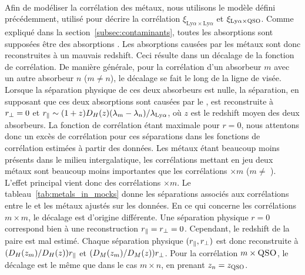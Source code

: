 \documentclass[11pt, twoside, a4paper, openright]{report}
\begin{document}
\paragraph{}
Afin de modéliser la corrélation des métaux, nous utilisons le modèle défini précédemment, utilisé pour décrire la corrélation $\xi_{\mathrm{Ly}\alpha\times\mathrm{Ly}\alpha}$ et $\xi_{\mathrm{Ly}\alpha\times\textsc{\textsc{QSO}}}$.
Comme expliqué dans la section~\ref{subsec:contaminants}, toutes les absorptions sont supposées être des absorptions \lya{}. Les absorptions causées par les métaux sont donc reconstruites à un mauvais redshift. Ceci résulte dans un décalage de la fonction de corrélation.
De manière générale, pour la corrélation d'un absorbeur $m$ avec un autre absorbeur $n$ ($m \neq n$), le décalage se fait le long de la ligne de visée. Lorsque la séparation physique de ces deux absorbeurs est nulle, la séparation, en supposant que ces deux absorptions sont causées par le \lya{}, est reconstruite à $r_{\perp}{} = 0$ et $r_{\parallel}{} \sim (1+z)D_H(z)(\lambda_m - \lambda_{n} ) / \lambda_{\mathrm{Ly}\alpha}$, où $z$ est le redshift moyen des deux absorbeurs.
La fonction de corrélation étant maximale pour $r = 0$, nous attentons donc un excès de corrélation pour ces séparations dans les fonctions de corrélation estimées à partir des données. Les métaux étant beaucoup moins présents dans le milieu intergalatique, les corrélations mettant en jeu deux métaux sont beaucoup moins importantes que les corrélations \lya{}$\times m$ ($m \neq$ \lya). L'effet principal vient donc des corrélations \lya{}$\times m$. 
Le tableau~\ref{tab:metals_in_mocks} donne les séparations associés aux corrélations entre le \lya{} et les métaux ajustés sur les données.
En ce qui concerne les corrélations $m \times m$, le décalage est d'origine différente. Une séparation physique $r=0$ correspond bien à une reconstruction $r_{\parallel}{} = r_{\perp}{} = 0$. Cependant, le redshift de la paire est mal estimé. Chaque séparation physique $(r_{\parallel}{}, r_{\perp}{})$ est donc reconstruite à $(D_H(z_m) / D_H(z))r_{\parallel}{}$ et $(D_M(z_m)/D_M(z))r_{\perp}{}$.
Pour la corrélation $m \times \textsc{QSO}$, le décalage est le même que dans le cas $m\times n$, en prenant $z_n = z_{\textsc{QSO}}$.
\end{document}
